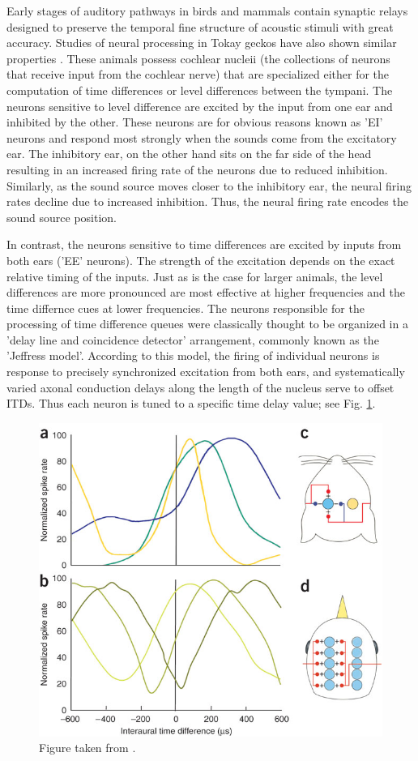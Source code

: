 Early stages of auditory pathways in birds and mammals contain synaptic relays designed to preserve the temporal fine structure of 
acoustic stimuli with great accuracy.  Studies of neural processing in Tokay geckos have also shown similar properties \cite{dalsgaardtangcarr}.
These animals possess cochlear nucleii (the collections of neurons that receive input from the cochlear nerve) that are specialized either for
the computation of time differences or level differences between the tympani. The neurons sensitive to level difference are excited by the 
input from one ear and inhibited by the other. These neurons are for obvious reasons known as 'EI' neurons and respond most strongly when the
sounds come from the excitatory ear. The inhibitory ear, on the other hand sits on the far side of the head resulting in an increased firing
rate of the neurons due to reduced inhibition. Similarly, as the sound source moves closer to the inhibitory ear, the neural firing rates decline
due to increased inhibition. Thus, the neural firing rate encodes the sound source position. 

In contrast, the neurons sensitive to time differences are excited by inputs from both ears ('EE' neurons). The strength of the
excitation depends on the exact relative timing of the inputs. Just as is the case for larger animals, the level
differences are more pronounced are most effective at higher frequencies and the time differnce cues at lower frequencies. The neurons responsible for 
the processing of time difference queues were classically thought to be organized in a 'delay line and coincidence detector' arrangement, commonly
known as the 'Jeffress model'\cite{jeffressmodel}. According to this model, the firing of individual neurons is response to precisely synchronized excitation
from both ears, and systematically varied axonal conduction delays along the length of the nucleus serve to offset ITDs. Thus each neuron is tuned to a 
specific time delay value; see Fig. \ref{jeffressmodel}.

\begin{figure}[ht!]
 \centering
 \includegraphics[width=0.7\linewidth]{Diagrams/itdcomputation.jpg}
 \caption[Delay line coincidence detector - Jeffress model]{Figure taken from \cite{schnuppcarr}.}
 \label{jeffressmodel}
\end{figure}

